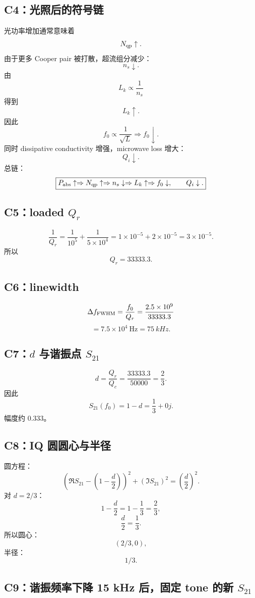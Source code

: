 \documentclass[11pt,a4paper,openany]{ctexrep}
\begin{document}
\subsection*{C4：光照后的符号链}

光功率增加通常意味着
\[
N_{\rm qp}\uparrow.
\]
由于更多 Cooper pair 被打散，超流组分减少：
\[
n_s\downarrow.
\]
由
\[
L_k\propto\frac1{n_s}
\]
得到
\[
L_k\uparrow.
\]
因此
\[
f_0\propto\frac1{\sqrt{L}}
\Rightarrow
f_0\downarrow.
\]
同时 dissipative conductivity 增强，microwave loss 增大：
\[
Q_i\downarrow.
\]
总链：
\[
\boxed{
P_{\rm abs}\uparrow
\Rightarrow N_{\rm qp}\uparrow
\Rightarrow n_s\downarrow
\Rightarrow L_k\uparrow
\Rightarrow f_0\downarrow,
\qquad Q_i\downarrow.
}
\]

\subsection*{C5：loaded $Q_r$}

\[
\frac1{Q_r}=\frac1{10^5}+\frac1{5\times10^4}
=1\times10^{-5}+2\times10^{-5}
=3\times10^{-5}.
\]
所以
\[
\boxed{Q_r=33333.3}.
\]

\subsection*{C6：linewidth}

\[
\Delta f_{\rm FWHM}=\frac{f_0}{Q_r}
=\frac{2.5\times10^9}{33333.3}
\]
\[
=7.5\times10^4\ \mathrm{Hz}
=\boxed{\SI{75}{kHz}}.
\]

\subsection*{C7：$d$ 与谐振点 $S_{21}$}

\[
d=\frac{Q_r}{Q_c}
=\frac{33333.3}{50000}
=\boxed{\frac23}.
\]
因此
\[
S_{21}(f_0)=1-d
=\boxed{\frac13+0j}.
\]
幅度约 $0.333$。

\subsection*{C8：IQ 圆圆心与半径}

圆方程：
\[
\left(\Re S_{21}-\left(1-\frac d2\right)\right)^2
+(\Im S_{21})^2
=\left(\frac d2\right)^2.
\]
对 $d=2/3$：
\[
1-\frac d2=1-\frac13=\frac23,
\]
\[
\frac d2=\frac13.
\]
所以圆心：
\[
\boxed{(2/3,0)},
\]
半径：
\[
\boxed{1/3}.
\]

\subsection*{C9：谐振频率下降 15 kHz 后，固定 tone 的新 $S_{21}$}
\end{document}
